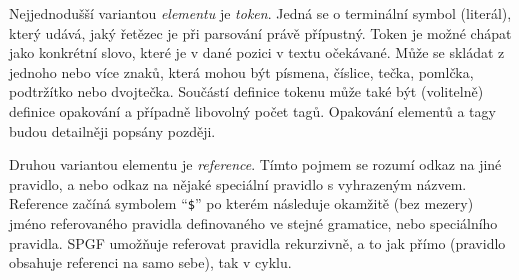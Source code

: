 \begin{center}
\end{center}

Nejjednodušší variantou \emph{elementu} je \emph{token}.
Jedná se o terminální symbol (literál), který udává, jaký řetězec je při parsování právě přípustný.
Token je možné chápat jako konkrétní slovo, které je v dané pozici v textu očekávané.
Může se skládat z jednoho nebo více znaků, která mohou být písmena, číslice, tečka, pomlčka, podtržítko nebo dvojtečka.
Součástí definice tokenu může také být (volitelně) definice opakování a případně libovolný počet tagů.
Opakování elementů a tagy budou detailněji popsány později.

Druhou variantou elementu je \emph{reference}.
Tímto pojmem se rozumí odkaz na jiné pravidlo, a nebo odkaz na nějaké speciální pravidlo s vyhrazeným názvem.
Reference začíná symbolem \enquote{\texttt{\$}} po kterém následuje okamžitě (bez mezery) jméno referovaného
pravidla definovaného ve stejné gramatice, nebo speciálního pravidla.
SPGF umožňuje referovat pravidla rekurzivně, a to jak přímo (pravidlo obsahuje referenci na samo sebe), tak v cyklu.

